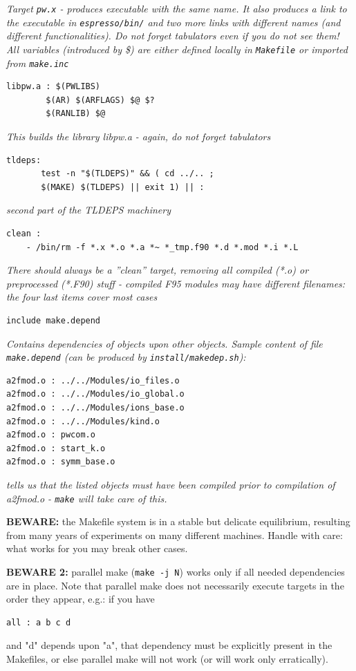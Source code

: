 \documentclass[12pt,a4paper]{article}
\begin{document}
{\em Target {\tt pw.x} - produces executable with the same name.
  It also produces a link to the executable in {\tt espresso/bin/}
  and two more links with different names (and different functionalities).
Do not forget tabulators even if you do not see them!
All variables (introduced by \$) are either defined locally
in {\tt Makefile} or imported from {\tt make.inc}}
\begin{verbatim}
libpw.a : $(PWLIBS)
        $(AR) $(ARFLAGS) $@ $?
        $(RANLIB) $@
\end{verbatim}
{\em This builds the library libpw.a - again, do not forget tabulators}
\begin{verbatim}
tldeps:
       test -n "$(TLDEPS)" && ( cd ../.. ;
       $(MAKE) $(TLDEPS) || exit 1) || :
\end{verbatim}
{\em second part of the TLDEPS machinery}
\begin{verbatim}
clean :
	- /bin/rm -f *.x *.o *.a *~ *_tmp.f90 *.d *.mod *.i *.L
\end{verbatim}
{\em There should always be a ''clean'' target, removing all compiled (*.o)
or preprocessed (*.F90) stuff - compiled F95 modules may have different
filenames: the four last items cover most cases}
\begin{verbatim}
include make.depend
\end{verbatim}
{\em Contains dependencies of objects upon other objects. Sample
content of file {\tt make.depend} (can be produced by {\tt install/makedep.sh}):}
\begin{verbatim}
a2fmod.o : ../../Modules/io_files.o
a2fmod.o : ../../Modules/io_global.o
a2fmod.o : ../../Modules/ions_base.o
a2fmod.o : ../../Modules/kind.o
a2fmod.o : pwcom.o
a2fmod.o : start_k.o
a2fmod.o : symm_base.o
\end{verbatim}
{\em tells us that the listed objects must have been compiled
prior to compilation of a2fmod.o - {\tt make} will take care of this.}

{\bf BEWARE:} the Makefile system is in a stable but delicate equilibrium,
resulting from many years of experiments on many different machines.
Handle with care: what works for you may break other cases.

{\bf BEWARE 2:} parallel make (\texttt{make -j N}) works only if all
needed dependencies are in place. Note that parallel make does not 
necessarily execute targets in the order they appear, e.g.: if you have
\begin{verbatim}
all : a b c d
\end{verbatim}
and "d" depends upon "a", that dependency must be explicitly present
in the Makefiles, or else parallel make will not work (or will work 
only erratically).
\end{document}
